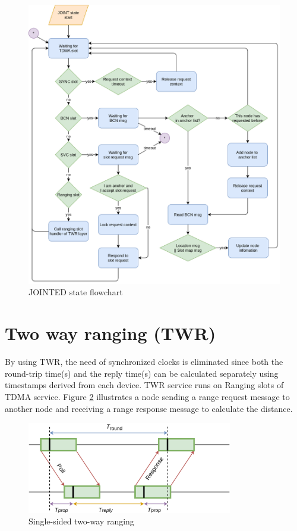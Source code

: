 \documentclass[\main/main.tex]{subfiles}
\begin{document}
\begin{figure}[H]
    \begin{center}
        \includegraphics[width=1\textwidth]{JOINTED_state_flow_chart.png}
    \end{center}
    \caption{JOINTED state flowchart}
    \label{fig:JOINTED_state_flowchart}
\end{figure}

\section{Two way ranging (TWR)}
By using TWR, the need of synchronized clocks is eliminated since both the round-trip time(s) and the reply time(s) can be calculated separately using timestamps derived from each device. TWR service runs on Ranging slots of TDMA service. Figure \ref{fig:single_sided_two_way_ranging} illustrates a node sending a range request message to another node and receiving a range response message to calculate the distance.

\begin{figure}[H]
    \begin{center}
        \includegraphics[width=0.8\textwidth]{single_sided_two_way_ranging.png}
    \end{center}
    \caption{Single-sided two-way ranging}
    \label{fig:single_sided_two_way_ranging}
\end{figure}
\end{document}
